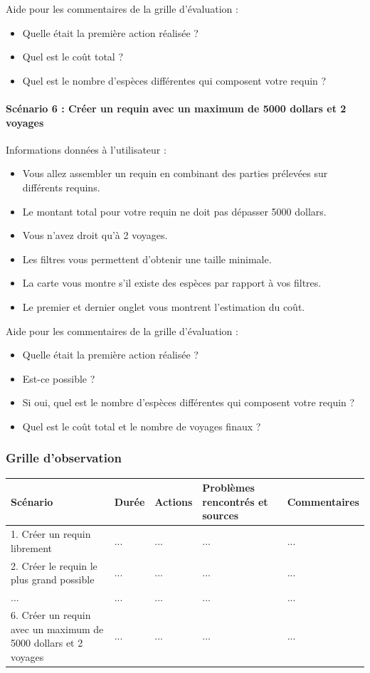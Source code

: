 \documentclass{article}
\begin{document}
Aide pour les commentaires de la grille d'évaluation :
\begin{itemize}
    \item Quelle était la première action réalisée ?
    \item Quel est le coût total ?
    \item Quel est le nombre d'espèces différentes qui composent votre requin ?
\end{itemize}

\paragraph{Scénario 6 : Créer un requin avec un maximum de 5000 dollars et 2 voyages}
Informations données à l'utilisateur :
\begin{itemize}
    \item Vous allez assembler un requin en combinant des parties prélevées sur différents requins.
    \item Le montant total pour votre requin ne doit pas dépasser 5000 dollars.
    \item Vous n'avez droit qu'à 2 voyages.
    \item Les filtres vous permettent d'obtenir une taille minimale.
    \item La carte vous montre s'il existe des espèces par rapport à vos filtres.
    \item Le premier et dernier onglet vous montrent l'estimation du coût.
\end{itemize}

Aide pour les commentaires de la grille d'évaluation :
\begin{itemize}
    \item Quelle était la première action réalisée ?
    \item Est-ce possible ?
    \item Si oui, quel est le nombre d'espèces différentes qui composent votre requin ?
    \item Quel est le coût total et le nombre de voyages finaux ?
\end{itemize}

\subsubsection{Grille d'observation}

\begin{table}[h]
\centering
\begin{tabular}{|p{6cm}|p{1.5cm}|p{1.5cm}|p{2.5cm}|p{3.5cm}|}
\hline
Scénario & Durée & Actions & Problèmes rencontrés et sources & Commentaires \\ \hline
1. Créer un requin librement & ... & ... & ... & ... \\ \hline
2. Créer le requin le plus grand possible & ... & ... & ... & ... \\ \hline
... & ... & ... & ... & ... \\ \hline
6. Créer un requin avec un maximum de 5000 dollars et 2 voyages & ... & ... & ... & ... \\ \hline
\end{tabular}
\end{table}
\end{document}

